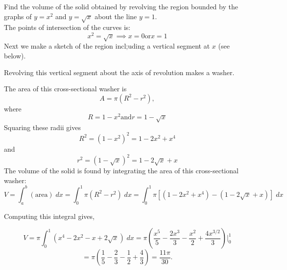 \documentclass{ximera}
\begin{document}
\begin{example}[example 7] Find the volume of the solid obtained by revolving the region bounded by the graphs of 
$y = x^2$ and $y = \sqrt x$ about the line $y = 1$.\\
The points of intersection of the curves is:
\[
x^2 = \sqrt x \implies x = 0 \text{or} x=1\]
Next we make a sketch of the region incl;uding a vertical segment at $x$ (see below).

Revolving this vertical segment about the axis of revolution makes a washer.

The area of this cross-sectional washer is
\[
A = \pi(R^2 -r^2),
\]
where 
\[
R = 1-x^2 \text{and} r = 1 - \sqrt x
\]
Squaring these radii gives
\[
R^2 = (1-x^2)^2 = 1 - 2x^2 + x^4
\]
and
\[
r^2 = (1-\sqrt x)^2 = 1 - 2\sqrt x + x
\]
The volume of the solid is found by integrating the area of this cross-sectional washer:
\[
V = \int_a^b (\text{area}) \; dx = \int_0^1 \pi(R^2 -r^2) \; dx = \int_0^1 \pi [(1-2x^2 + x^4) - (1-2\sqrt x + x)] \; dx
\]

Computing this integral gives,

\[
V = \pi \int_0^1 (x^4 -2x^2 - x + 2\sqrt x) \; dx = \pi \left(\frac{x^5}{5} - \frac{2x^3}{3} - \frac{x^2}{2} + \frac{4x^{3/2}}{3} \right) \bigg|_0^1
\]
\[
= \pi \left(\frac15 -\frac23 - \frac12 + \frac43 \right) = \frac{11\pi}{30}.
\]




\begin{image}
\end{image}
\end{example}
\end{document}
